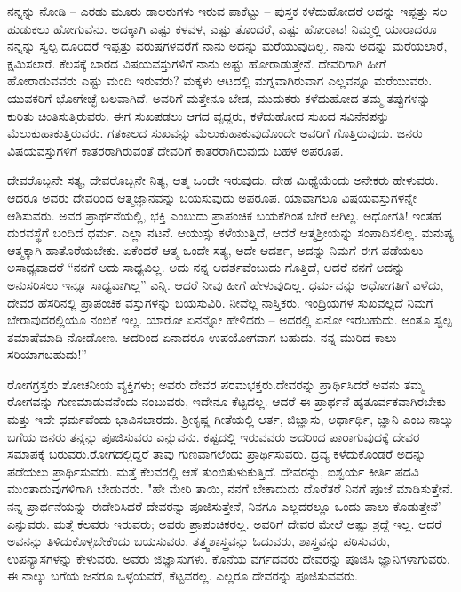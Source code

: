 ನನ್ನನ್ನು ನೋಡಿ – ಎರಡು ಮೂರು ಡಾಲರುಗಳು ಇರುವ ಪಾಕೆಟ್ಟು – ಪುಸ್ತಕ ಕಳೆದುಹೋದರೆ ಅದನ್ನು ಇಪ್ಪತ್ತು ಸಲ ಹುಡುಕಲು ಹೋಗುವೆನು. ಅದಕ್ಕಾಗಿ ಎಷ್ಟು ಕಳವಳ, ಎಷ್ಟು ತೊಂದರೆ, ಎಷ್ಟು ಹೋರಾಟ! ನಿಮ್ಮಲ್ಲಿ ಯಾರಾದರೂ ನನ್ನನ್ನು ಸ್ವಲ್ಪ ದೂರಿದರೆ ಇಪ್ಪತ್ತು ವರುಷಗಳವರೆಗೆ ನಾನು ಅದನ್ನು ಮರೆಯುವುದಿಲ್ಲ. ನಾನು ಅದನ್ನು ಮರೆಯಲಾರೆ, ಕ್ಷಮಿಸಲಾರೆ. ಕೆಲಸಕ್ಕೆ ಬಾರದ ವಿಷಯವಸ್ತುಗಳಿಗೆ ನಾನು ಅಷ್ಟು ಹೋರಾಡುತ್ತೇನೆ. ದೇವರಿಗಾಗಿ ಹೀಗೆ ಹೋರಾಡುವವರು ಎಷ್ಟು ಮಂದಿ ಇರುವರು? ಮಕ್ಕಳು ಆಟದಲ್ಲಿ ಮಗ್ನವಾಗಿರುವಾಗ ಎಲ್ಲವನ್ನೂ ಮರೆಯುವರು. ಯುವಕರಿಗೆ ಭೋಗೇಚ್ಛೆ ಬಲವಾಗಿದೆ. ಅವರಿಗೆ ಮತ್ತೇನೂ ಬೇಡ, ಮುದುಕರು ಕಳೆದುಹೋದ ತಮ್ಮ ತಪ್ಪುಗಳನ್ನು ಕುರಿತು ಚಿಂತಿಸುತ್ತಿರುವರು. ಈಗ ಸುಖಪಡಲು ಆಗದ ವೃದ್ದರು, ಕಳೆದುಹೋದ ಸುಖದ ಸವಿನೆನಪನ್ನು ಮೆಲುಕುಹಾಕುತ್ತಿರುವರು. ಗತಕಾಲದ ಸುಖವನ್ನು ಮೆಲುಕುಹಾಕುವುದೊಂದೇ ಅವರಿಗೆ ಗೊತ್ತಿರುವುದು. ಜನರು ವಿಷಯವಸ್ತುಗಳಿಗೆ ಕಾತರರಾಗಿರುವಂತೆ ದೇವರಿಗೆ ಕಾತರರಾಗಿರುವುದು ಬಹಳ ಅಪರೂಪ.

ದೇವರೊಬ್ಬನೇ ಸತ್ಯ, ದೇವರೊಬ್ಬನೇ ನಿತ್ಯ, ಆತ್ಮ ಒಂದೇ ಇರುವುದು. ದೇಹ ಮಿಥ್ಯೆಯೆಂದು ಅನೇಕರು ಹೇಳುವರು. ಆದರೂ ಅವರು ದೇವರಿಂದ ಆತ್ಮಜ್ಞಾನವನ್ನು ಬಯಸುವುದು ಅಪರೂಪ. ಯಾವಾಗಲೂ ವಿಷಯವಸ್ತುಗಳನ್ನೇ ಆಶಿಸುವರು. ಅವರ ಪ್ರಾರ್ಥನೆಯಲ್ಲಿ, ಭಕ್ತಿ ಎಂಬುದು ಪ್ರಾಪಂಚಿಕ ಬಯಕೆಗಿಂತ ಬೇರೆ ಆಗಿಲ್ಲ. ಅಧೋಗತಿ! ಇಂತಹ ದುರವಸ್ಥೆಗೆ ಬಂದಿದೆ ಧರ್ಮ. ಎಲ್ಲಾ ನಟನೆ. ಆಯುಸ್ಸು ಕಳೆಯುತ್ತಿದೆ, ಆದರೆ ಆತ್ಮಶ‍್ರೀಯನ್ನು ಸಂಪಾದಿಸಲಿಲ್ಲ. ಮನುಷ್ಯ ಆತ್ಮಕ್ಕಾಗಿ ಹಾತೊರೆಯಬೇಕು. ಏಕೆಂದರೆ ಆತ್ಮ ಒಂದೇ ಸತ್ಯ, ಅದೇ ಆದರ್ಶ, ಅದನ್ನು ನಿಮಗೆ ಈಗ ಪಡೆಯಲು ಅಸಾಧ್ಯವಾದರೆ “ನನಗೆ ಅದು ಸಾಧ್ಯವಿಲ್ಲ. ಅದು ನನ್ನ ಆದರ್ಶವೆಂಬುದು ಗೊತ್ತಿದೆ, ಆದರೆ ನನಗೆ ಅದನ್ನು ಅನುಸರಿಸಲು ಇನ್ನೂ ಸಾಧ್ಯವಾಗಿಲ್ಲ” ಎನ್ನಿ. ಆದರೆ ನೀವು ಹೀಗೆ ಹೇಳುವುದಿಲ್ಲ. ಧರ್ಮವನ್ನು ಅಧೋಗತಿಗೆ ಎಳೆದು, ದೇವರ ಹೆಸರಿನಲ್ಲಿ ಪ್ರಾಪಂಚಿಕ ವಸ್ತುಗಳನ್ನು ಬಯಸುವಿರಿ. ನೀವೆಲ್ಲ ನಾಸ್ತಿಕರು. ಇಂದ್ರಿಯಗಳ ಸುಖವಲ್ಲದೆ ನಿಮಗೆ ಬೇರಾವುದರಲ್ಲಿಯೂ ನಂಬಿಕೆ ಇಲ್ಲ. ಯಾರೋ ಏನನ್ನೋ ಹೇಳಿದರು – ಅದರಲ್ಲಿ ಏನೋ ಇರಬಹುದು. ಅಂತೂ ಸ್ವಲ್ಪ ತಮಾಷೆಮಾಡಿ ನೋಡೋಣ. ಅದರಿಂದ ಏನಾದರೂ ಉಪಯೋಗವಾಗ ಬಹುದು. ನನ್ನ ಮುರಿದ ಕಾಲು ಸರಿಯಾಗಬಹುದು!”

ರೋಗಗ್ರಸ್ತರು ಶೋಚನೀಯ ವ್ಯಕ್ತಿಗಳು; ಅವರು ದೇವರ ಪರಮಭಕ್ತರು.\break ದೇವರನ್ನು ಪ್ರಾರ್ಥಿಸಿದರೆ ಅವನು ತಮ್ಮ ರೋಗವನ್ನು ಗುಣಮಾಡುವನೆಂದು ನಂಬುವರು, ಇದೇನೂ ಕೆಟ್ಟದಲ್ಲ. ಆದರೆ ಈ ಪ್ರಾರ್ಥನೆ ಹೃತೂರ್ವಕವಾಗಿರಬೇಕು ಮತ್ತು ಇದೇ ಧರ್ಮವೆಂದು ಭಾವಿಸಬಾರದು. ಶ‍್ರೀಕೃಷ್ಣ ಗೀತೆಯಲ್ಲಿ ಆರ್ತ, ಜಿಜ್ಞಾಸು, ಅರ್ಥಾರ್ಥಿ, ಜ್ಞಾನಿ ಎಂಬ ನಾಲ್ಕು ಬಗೆಯ ಜನರು ತನ್ನನ್ನು ಪೂಜಿಸುವರು ಎನ್ನುವನು. ಕಷ್ಟದಲ್ಲಿ ಇರುವವರು ಅದರಿಂದ ಪಾರಾಗುವುದಕ್ಕೆ ದೇವರ ಸಮಾಪಕ್ಕೆ ಬರುವರು.\break ರೋಗದಲ್ಲಿದ್ದರೆ ತಾವು ಗುಣವಾಗಲೆಂದು ಪ್ರಾರ್ಥಿಸುವರು. ದ್ರವ್ಯ ಕಳೆದುಕೊಂಡರೆ ಅದನ್ನು ಪಡೆಯಲು ಪ್ರಾರ್ಥಿಸುವರು. ಮತ್ತೆ ಕೆಲವರಲ್ಲಿ ಆಶೆ ತುಂಬಿತುಳುಕುತ್ತಿದೆ. ದೇವರನ್ನು, ಐಶ್ವರ್ಯ ಕೀರ್ತಿ ಪದವಿ ಮುಂತಾದುವುಗಳಿಗಾಗಿ ಬೇಡುವರು. "ಹೇ ಮೇರಿ ತಾಯಿ, ನನಗೆ ಬೇಕಾದುದು ದೊರೆತರೆ ನಿನಗೆ ಪೂಜೆ ಮಾಡಿಸುತ್ತೇನೆ. ನನ್ನ ಪ್ರಾರ್ಥನೆಯನ್ನು ಈಡೇರಿಸಿದರೆ ದೇವರನ್ನು ಪೂಜಿಸುತ್ತೇನೆ, ನಿನಗೂ ಎಲ್ಲದರಲ್ಲೂ ಒಂದು ಪಾಲು ಕೊಡುತ್ತೇನೆ' ಎನ್ನುವರು. ಮತ್ತೆ ಕೆಲವರು ಇರುವರು; ಅವರು ಪ್ರಾಪಂಚಿಕರಲ್ಲ. ಅವರಿಗೆ ದೇವರ ಮೇಲೆ ಅಷ್ಟು ಶ್ರದ್ದೆ ಇಲ್ಲ. ಆದರೆ ಅವನನ್ನು ತಿಳಿದುಕೊಳ್ಳಬೇಕೆಂದು ಬಯಸುವರು. ತತ್ತ್ವಶಾಸ್ತ್ರವನ್ನು ಓದುವರು, ಶಾಸ್ತ್ರವನ್ನು ಪಠಿಸುವರು, ಉಪನ್ಯಾಸಗಳನ್ನು ಕೇಳುವರು. ಅವರು ಜಿಜ್ಞಾಸುಗಳು. ಕೊನೆಯ ವರ್ಗದವರು ದೇವರನ್ನು ಪೂಜಿಸಿ ಜ್ಞಾನಿಗಳಾಗುವರು. ಈ ನಾಲ್ಕು ಬಗೆಯ ಜನರೂ ಒಳ್ಳೆಯವರೆ, ಕೆಟ್ಟವರಲ್ಲ. ಎಲ್ಲರೂ ದೇವರನ್ನು ಪೂಜಿಸುವವರು.

